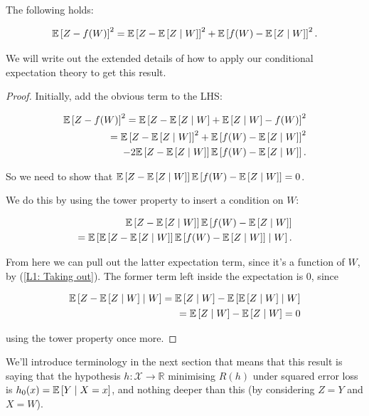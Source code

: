 \documentclass[11pt]{scrartcl}
\begin{document}
\begin{theorem}
\label{best least squares}

The following holds:

\begin{equation}
    \E{Z-f(W)}^2 = \E{Z - \E{Z \mid W}}^2 + \E{f(W)-\E{Z \mid W}}^2.
\end{equation}

We will write out the extended details of how to apply our conditional expectation theory to get this result.

\begin{proof}
Initially, add the obvious term to the LHS:

\begin{align*}
    \E{Z-f(W)}^2 = \E{Z-\E{Z\mid W} + \E{Z\mid W} - f(W)}^2 \\
    = \E{Z - \E{Z \mid W}}^2 + \E{f(W)-\E{Z \mid W}}^2 \\
    - 2 \E{Z - \E{Z\mid W}} \E{f(W)-\E{Z\mid W}}.
\end{align*}

So we need to show that $\E{Z - \E{Z\mid W}} \E{f(W)-\E{Z\mid W}}=0$.

We do this by using the tower property to insert a condition on $W$:

\begin{align*}
    \E{Z - \E{Z\mid W}} \E{f(W)-\E{Z\mid W}} \\
    = \E{ \E{Z - \E{Z\mid W}} \E{f(W)-\E{Z\mid W}} \mid W}.
\end{align*}

From here we can pull out the latter expectation term, since it's a function of $W$, by (\ref{L1: Taking out}). The former term left inside the expectation is 0, since

\begin{align*}
    \E{Z - \E{Z \mid W} \mid W} = \E{Z \mid W} - \E{\E{Z \mid W} \mid W} \\
    = \E{Z \mid W} - \E{Z \mid W} = 0
\end{align*}

using the tower property once more.

\end{proof}
\end{theorem}

We'll introduce terminology in the next section that means that this result is saying that the hypothesis $h:\mathcal{X} \rightarrow \mathbb{R}$ minimising $R(h)$ under squared error loss is $h_0(x)=\E{Y \mid X = x}$, and nothing deeper than this (by considering $Z=Y$ and $X=W$).
\end{document}
